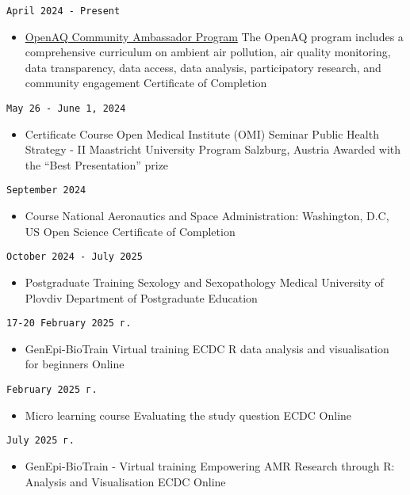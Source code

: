 \documentclass[
  12pt,
  letterpaper,
  DIV=11,
  numbers=noendperiod]{scrartcl}
\providecommand{\tightlist}{%
  \setlength{\itemsep}{0pt}\setlength{\parskip}{0pt}}\usepackage{longtable,booktabs,array}
\begin{document}
\texttt{April\ 2024\ -\ Present}

\begin{itemize}
\tightlist
\item
  \href{https://openaq.org/about/people/kostadin-kostadinov/}{OpenAQ
  Community Ambassador Program} \textbar{} The OpenAQ program includes a
  comprehensive curriculum on ambient air pollution, air quality
  monitoring, data transparency, data access, data analysis,
  participatory research, and community engagement \textbar{}
  Certificate of Completion
\end{itemize}

\texttt{May\ 26\ -\ June\ 1,\ 2024}

\begin{itemize}
\tightlist
\item
  Certificate Course \textbar{} Open Medical Institute (OMI) Seminar
  \textbar{} Public Health Strategy - II \textbar{} Maastricht
  University Program \textbar{} Salzburg, Austria \textbar{} Awarded
  with the ``Best Presentation'' prize
\end{itemize}

\texttt{September\ 2024}

\begin{itemize}
\tightlist
\item
  Course \textbar{} National Aeronautics and Space Administration:
  Washington, D.C, US \textbar{} Open Science \textbar{} Certificate of
  Completion
\end{itemize}

\texttt{October\ 2024\ -\ July\ 2025}

\begin{itemize}
\tightlist
\item
  Postgraduate Training \textbar{} Sexology and Sexopathology \textbar{}
  Medical University of Plovdiv \textbar{} Department of Postgraduate
  Education
\end{itemize}

\texttt{17-20\ February\ 2025\ г.}

\begin{itemize}
\tightlist
\item
  GenEpi-BioTrain Virtual training \textbar{} ECDC \textbar{} R data
  analysis and visualisation for beginners \textbar{} Online
\end{itemize}

\texttt{February\ 2025\ г.}

\begin{itemize}
\tightlist
\item
  Micro learning course \textbar{} Evaluating the study question
  \textbar{} ECDC \textbar{} Online
\end{itemize}

\texttt{July\ 2025\ г.}

\begin{itemize}
\tightlist
\item
  GenEpi-BioTrain - Virtual training \textbar{} Empowering AMR Research
  through R: Analysis and Visualisation \textbar{} ECDC \textbar{}
  Online
\end{itemize}
\end{document}
